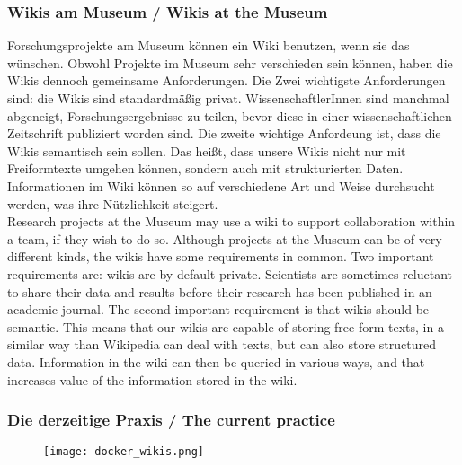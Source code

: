 \documentclass[12pt]{beamer}
\begin{document}
{\scriptsize
\begin{frame}
  \frametitle{Wikis am Museum / \textcolor{mfn_green}{Wikis at the Museum}}
Forschungsprojekte am Museum können ein Wiki benutzen, wenn sie das wünschen. Obwohl Projekte im Museum sehr verschieden sein können, haben die Wikis dennoch gemeinsame Anforderungen. Die Zwei wichtigste Anforderungen sind: die Wikis sind standardmäßig privat. WissenschaftlerInnen sind manchmal abgeneigt, Forschungsergebnisse zu teilen, bevor diese in einer wissenschaftlichen Zeitschrift publiziert worden sind. Die zweite wichtige Anfordeung ist, dass die Wikis semantisch sein sollen. Das heißt, dass unsere Wikis nicht nur mit Freiformtexte umgehen können, sondern auch mit strukturierten Daten. Informationen im Wiki können so auf verschiedene Art und Weise durchsucht werden, was ihre Nützlichkeit steigert.\\
  \bigskip
  \textcolor{mfn_green}{Research projects at the Museum may use a wiki to support collaboration within a team, if they wish to do so. Although projects at the Museum can be of very different kinds, the wikis have some requirements in common. Two important requirements are: wikis are by default private. Scientists are sometimes reluctant to share their data and results before their research has been published in an academic journal. The second important requirement is that wikis should be semantic. This means that our wikis are capable of storing free-form texts, in a similar way than Wikipedia can deal with texts, but can also store structured data. Information in the wiki can then be queried in various ways, and that increases value of the information stored in the wiki.}
\end{frame}
}
\begin{frame}
  \frametitle{Die derzeitige Praxis / \textcolor{mfn_green}{The current practice}}
  \begin{figure}
    \texttt{[image: docker\_wikis.png]}
  \end{figure}
\end{frame}
\end{document}
